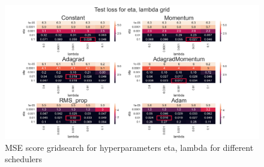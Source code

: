 \documentclass[onecolumn,10pt,cleanfoot]{asme2ej}
\begin{document}
\begin{figure}[H]
\centerline{\includegraphics[width=8in]{figure/new_100e_gridsearch.png}}
\caption{MSE score gridsearch for hyperparameters eta, lambda for different schedulers}
\label{heatmap}
\end{figure}


\end{document}
